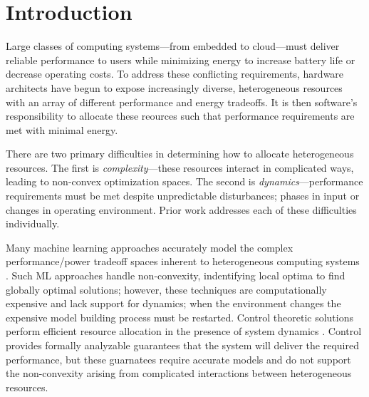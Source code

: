 \section{Introduction}
Large classes of computing systems---from embedded to cloud---must
deliver reliable performance to users while minimizing energy to
increase battery life or decrease operating costs.  To address these
conflicting requirements, hardware architects have begun to expose
increasingly diverse, heterogeneous resources with an array of
different performance and energy tradeoffs.  It is then software's
responsibility to allocate these reources such that performance
requirements are met with minimal energy.


There are two primary difficulties in determining how to allocate
heterogeneous resources.  The first is \emph{complexity}---these
resources interact in complicated ways, leading to non-convex
optimization spaces.  The second is \emph{dynamics}---perfor\-mance
requirements must be met despite unpredictable disturbances; \eg{}
phases in input or changes in operating environment.  Prior work
addresses each of these difficulties individually.

Many machine learning approaches accurately model the complex
performance/power tradeoff spaces inherent to heterogeneous computing
systems
\cite{reddiHPCA2013,dubach2010,Bitirgen2008,Ipek,Koala,LEO,Flicker,Ponamarev}.
Such ML approaches handle non-convexity, indentifying local optima to
find globally optimal solutions; however, these techniques are
computationally expensive and lack support for dynamics; \ie{} when
the environment changes the expensive model building process must be
restarted.  Control theoretic solutions perform efficient resource
allocation in the presence of system dynamics
\cite{Hellerstein2004a,Chen2011,PTRADE,POET,ControlWare,Agilos,grace2}.
Control provides formally analyzable guarantees that the system will
deliver the required performance, but these guarnatees require
accurate models and do not support the non-convexity arising from
complicated interactions between heterogeneous resources.


